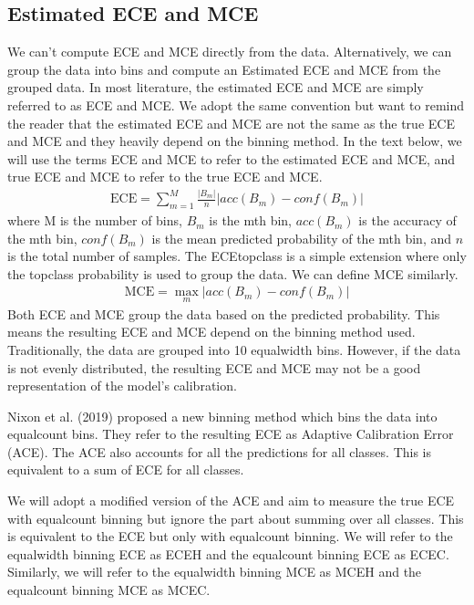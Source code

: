 \documentclass[letterpaper,10pt,english]{sphinxmanual}
\begin{document}
\subsection{Estimated ECE and MCE}
\label{\detokenize{notebooks/ece_mce:Estimated-ECE-and-MCE}}
\sphinxAtStartPar
We can’t compute ECE and MCE directly from the data. Alternatively, we can group the data into bins and compute an Estimated ECE and MCE from the grouped data. In most literature, the estimated ECE and MCE are simply referred to as ECE and MCE. We adopt the same convention but want to remind the reader that the estimated ECE and MCE are not the same as the true ECE and MCE and they heavily depend on the binning method. In the text below, we will use the terms ECE and MCE to refer to the
estimated ECE and MCE, and true ECE and MCE to refer to the true ECE and MCE.
\begin{equation*}
\begin{split}\text{ECE}  = \sum_{m=1}^M \frac{|B_m|}{n} |acc(B_m) - conf(B_m)|\end{split}
\end{equation*}
\sphinxAtStartPar
where M is the number of bins, \(B_m\) is the m\sphinxhyphen{}th bin, \(acc(B_m)\) is the accuracy of the m\sphinxhyphen{}th bin, \(conf(B_m)\) is the mean predicted probability of the m\sphinxhyphen{}th bin, and \(n\) is the total number of samples. The ECE\sphinxhyphen{}topclass is a simple extension where only the top\sphinxhyphen{}class probability is used to group the data. We can define MCE similarly.
\begin{equation*}
\begin{split}\text{MCE}  = \max_m |acc(B_m) - conf(B_m)|\end{split}
\end{equation*}
\sphinxAtStartPar
Both ECE and MCE group the data based on the predicted probability. This means the resulting ECE and MCE depend on the binning method used. Traditionally, the data are grouped into 10 equal\sphinxhyphen{}width bins. However, if the data is not evenly distributed, the resulting ECE and MCE may not be a good representation of the model’s calibration.

\sphinxAtStartPar
Nixon et al. (2019) proposed a new binning method which bins the data into equal\sphinxhyphen{}count bins. They refer to the resulting ECE as Adaptive Calibration Error (ACE). The ACE also accounts for all the predictions for all classes. This is equivalent to a sum of ECE for all classes.

\sphinxAtStartPar
We will adopt a modified version of the ACE and aim to measure the true ECE with equal\sphinxhyphen{}count binning but ignore the part about summing over all classes. This is equivalent to the ECE but only with equal\sphinxhyphen{}count binning. We will refer to the equal\sphinxhyphen{}width binning ECE as ECE\sphinxhyphen{}H and the equal\sphinxhyphen{}count binning ECE as ECE\sphinxhyphen{}C. Similarly, we will refer to the equal\sphinxhyphen{}width binning MCE as MCE\sphinxhyphen{}H and the equal\sphinxhyphen{}count binning MCE as MCE\sphinxhyphen{}C.
\end{document}

